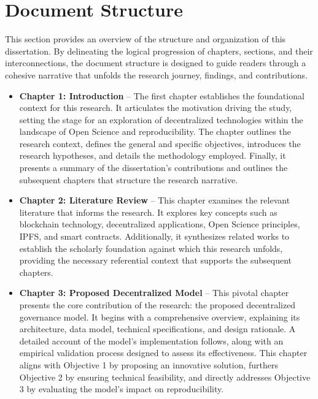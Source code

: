 \documentclass{article}
\begin{document}
\section{Document Structure}

This section provides an overview of the structure and organization of this dissertation. By delineating the logical progression of chapters, sections, and their interconnections, the document structure is designed to guide readers through a cohesive narrative that unfolds the research journey, findings, and contributions.

\begin{itemize}
    \item \textbf{Chapter 1: Introduction} – The first chapter establishes the foundational context for this research. It articulates the motivation driving the study, setting the stage for an exploration of decentralized technologies within the landscape of Open Science and reproducibility. The chapter outlines the research context, defines the general and specific objectives, introduces the research hypotheses, and details the methodology employed. Finally, it presents a summary of the dissertation’s contributions and outlines the subsequent chapters that structure the research narrative.

    \item \textbf{Chapter 2: Literature Review} – This chapter examines the relevant literature that informs the research. It explores key concepts such as blockchain technology, decentralized applications, Open Science principles, IPFS, and smart contracts. Additionally, it synthesizes related works to establish the scholarly foundation against which this research unfolds, providing the necessary referential context that supports the subsequent chapters.

    \item \textbf{Chapter 3: Proposed Decentralized Model} – This pivotal chapter presents the core contribution of the research: the proposed decentralized governance model. It begins with a comprehensive overview, explaining its architecture, data model, technical specifications, and design rationale. A detailed account of the model’s implementation follows, along with an empirical validation process designed to assess its effectiveness. This chapter aligns with Objective 1 by proposing an innovative solution, furthers Objective 2 by ensuring technical feasibility, and directly addresses Objective 3 by evaluating the model’s impact on reproducibility.


\end{itemize}
\end{document}
